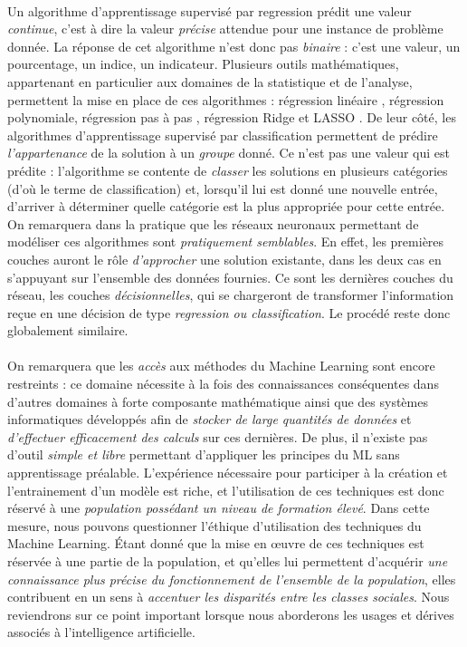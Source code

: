 \paragraph{} Un algorithme d'apprentissage supervisé par regression prédit une valeur \emph{continue}, c'est à dire la valeur \emph{précise} attendue pour une instance de problème donnée.
La réponse de cet algorithme n'est donc pas \emph{binaire} : c'est une valeur, un pourcentage, un indice, un indicateur. Plusieurs outils mathématiques, appartenant en particulier aux
domaines de la statistique et de l'analyse, permettent la mise en place de ces algorithmes \cite{MachineLearning3} : régression linéaire \cite{MachineLearning4}, régression polynomiale, régression pas à pas 
\cite{University1}, régression Ridge et LASSO \cite{University0}. De leur côté, les algorithmes d'apprentissage supervisé par classification permettent de prédire \emph{l'appartenance} de la
solution à un \emph{groupe} donné. Ce n'est pas une valeur qui est prédite : l'algorithme se contente de \emph{classer} les solutions en plusieurs catégories (d'où le terme de classification)
et, lorsqu'il lui est donné une nouvelle entrée, d'arriver à déterminer quelle catégorie est la plus appropriée pour cette entrée. On remarquera dans la pratique que les réseaux neuronaux
permettant de modéliser ces algorithmes sont \emph{pratiquement semblables}. En effet, les premières couches auront le rôle \emph{d'approcher} une solution existante, dans les deux cas en
s'appuyant sur l'ensemble des données fournies. Ce sont les dernières couches du réseau, les couches \emph{décisionnelles}, qui se chargeront de transformer l'information reçue en une décision
de type \emph{regression ou classification}. Le procédé reste donc globalement similaire.

\paragraph{} On remarquera que les \emph{accès} aux méthodes du Machine Learning sont encore restreints : ce domaine nécessite à la fois des connaissances conséquentes dans d'autres domaines 
à forte composante mathématique ainsi que des systèmes informatiques développés afin de \emph{stocker de large quantités de données} et \emph{d'effectuer efficacement des calculs} sur ces
dernières. De plus, il n'existe pas d'outil \emph{simple et libre} permettant d'appliquer les principes du ML sans apprentissage préalable. L'expérience nécessaire pour participer à la création 
et l'entrainement d'un modèle est riche, et l'utilisation de ces techniques est donc réservé à une \emph{population possédant un niveau de formation élevé}. Dans cette mesure, nous pouvons
questionner l'éthique d'utilisation des techniques du Machine Learning. Étant donné que la mise en \oe{}uvre de ces techniques est réservée à une partie de la population, et qu'elles lui permettent d'acquérir 
\emph{une connaissance plus précise du fonctionnement de l'ensemble de la population}, elles contribuent en un sens à \emph{accentuer les disparités entre les classes sociales}. Nous reviendrons
sur ce point important lorsque nous aborderons les usages et dérives associés à l'intelligence artificielle.


